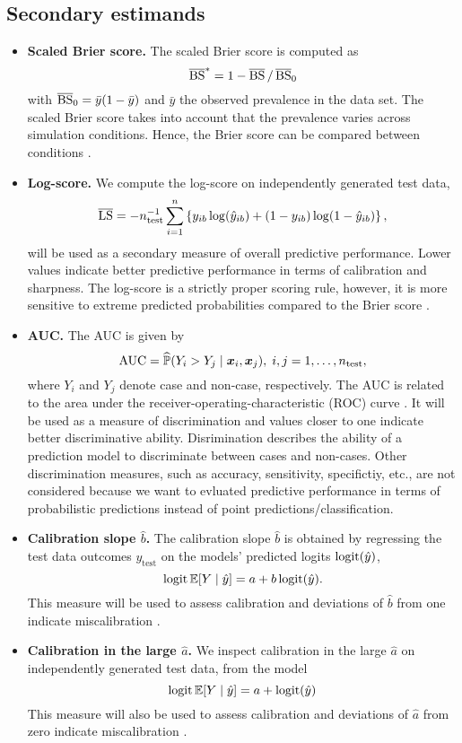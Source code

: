 \documentclass[a4paper, 11pt]{article}\usepackage[]{graphicx}\usepackage[]{color}
\begin{document}
\subsection{Secondary estimands}
\begin{itemize}
  \item \textbf{Scaled Brier score.} The scaled Brier score is computed as
  $$\operatorname{\overline{BS}}^{*} = 1 - \operatorname{\overline{BS}}/\operatorname{\overline{BS}}_{0}$$
  with $\operatorname{\overline{BS}}_{0} = \bar{y}(1 - \bar{y})$ and $\bar{y}$ the observed prevalence in
  the data set. The scaled Brier score takes into account that the
  prevalence varies across simulation conditions. Hence, the Brier score
  can be compared between conditions \citep{Schmid2005, steyerberg2019clinical}.

  \item \textbf{Log-score.} We compute the log-score on independently generated test data,
  $$\operatorname{\overline{LS}} = - n_{\text{test}}^{-1} \sum_{i=1}^n \left\{ y_{ib} \log(\hat{y}_{ib})
  + (1 - y_{ib}) \log (1 - \hat{y}_{ib})\right\},$$
  will be used as a secondary measure of overall predictive performance. Lower
  values indicate better predictive performance in terms of calibration and
  sharpness. The log-score is a strictly proper scoring rule, however, it is more
  sensitive to extreme predicted probabilities compared to the Brier score \citep{Gneiting2007}.
  
  \item \textbf{AUC.} The AUC is given by
  $$\text{AUC} = \widehat{\mathbb{P}}(Y_i > Y_j \mid \text{\boldmath$x$}_i, \text{\boldmath$x$}_j), \; i,j = 1, \dots, n_{\text{test}},$$
  where $Y_i$ and $Y_j$ denote case and non-case, respectively. The AUC is related
  to the area under the receiver-operating-characteristic (ROC) curve \citep{steyerberg2019clinical}.
  It will be used as a measure of discrimination and values closer to one
  indicate better discriminative ability. Disrimination describes the ability
  of a prediction model to discriminate between cases and non-cases.
  Other discrimination measures, such as accuracy, sensitivity, specifictiy, etc.,
  are not considered because we want to evluated predictive performance
  in terms of probabilistic predictions instead of point predictions/classification.

  \item \textbf{Calibration slope $\hat b$.}  
  The calibration slope $\hat b$ is obtained by regressing
  the test data outcomes $y_{\text{test}}$ on the models' predicted logits $\operatorname{logit}({\hat{y}})$,
  \ie
  $$\operatorname{logit}\mathbb{E}[Y \mid \hat{y}] = a + b\operatorname{logit}(\hat{y}).$$
  This measure will be used to assess calibration and deviations of $\hat b$ from
  one indicate miscalibration \citep{steyerberg2019clinical}.

  \item \textbf{Calibration in the large $\hat a$.} We inspect calibration in the
  large $\hat a$ on independently generated test data, from the model
  $$\operatorname{logit}\mathbb{E}[Y \mid \hat{y}] = a + \operatorname{logit}(\hat{y})$$
  This measure will also be used to assess calibration and deviations of $\hat a$ from
  zero indicate miscalibration \citep{steyerberg2019clinical}.
\end{itemize}
\end{document}
